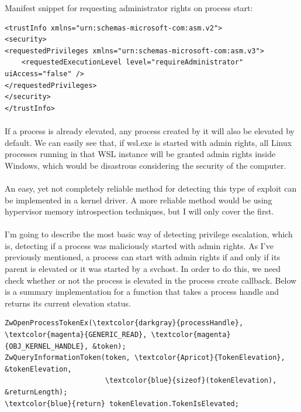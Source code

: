         Manifest snippet for requesting administrator rights on process start:
        \begin{verbatim}
<trustInfo xmlns="urn:schemas-microsoft-com:asm.v2">
<security>
<requestedPrivileges xmlns="urn:schemas-microsoft-com:asm.v3">
    <requestedExecutionLevel level="requireAdministrator" uiAccess="false" />
</requestedPrivileges>
</security>
</trustInfo>
        \end{verbatim}

        \paragraph{}
        If a process is already elevated, any process created by it will also be elevated by default. We can easily see that, if wsl.exe is
        started with admin rights, all Linux processes running in that WSL instance will be granted admin rights inside Windows, which would
        be disastrous considering the security of the computer.

        \paragraph{}
        An easy, yet not completely reliable method for detecting this type of exploit can be implemented in a kernel driver. A more reliable
        method would be using hypervisor memory introspection techniques, but I will only cover the first.

        \paragraph{}
        I'm going to describe the most basic way of detecting privilege escalation, which is, detecting if a process was maliciously started
        with admin rights. As I've previously mentioned, a process can start with admin rights if and only if its parent is elevated or it was started
        by a svchost. In order to do this, we need check whether or not the process is elevated in the process create callback. Below is a summary
        implementation for a function that takes a process handle and returns its current elevation status.

        \begin{Verbatim}[fontsize=\small, commandchars=\\\{\}]
ZwOpenProcessTokenEx(\textcolor{darkgray}{processHandle}, \textcolor{magenta}{GENERIC_READ}, \textcolor{magenta}{OBJ_KERNEL_HANDLE}, &token);
ZwQueryInformationToken(token, \textcolor{Apricot}{TokenElevation}, &tokenElevation,
                        \textcolor{blue}{sizeof}(tokenElevation), &returnLength);
\textcolor{blue}{return} tokenElevation.TokenIsElevated;
        \end{Verbatim}

